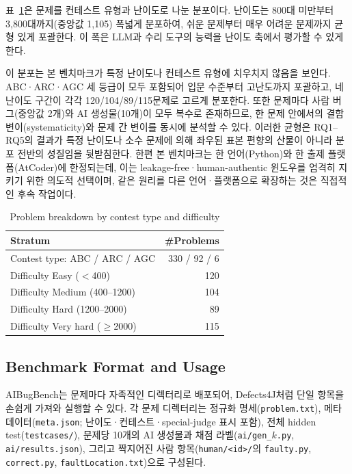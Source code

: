 \documentclass[10pt,conference]{IEEEtran}
\begin{document}
표~\ref{tab:breakdown}은 문제를 컨테스트 유형과 난이도로 나눈 분포이다. 난이도는 800대 미만부터 3{,}800대까지(중앙값 1{,}105) 폭넓게 분포하여, 쉬운 문제부터 매우 어려운 문제까지 균형 있게 포괄한다. 이 폭은 LLM과 수리 도구의 능력을 난이도 축에서 평가할 수 있게 한다.

이 분포는 본 벤치마크가 특정 난이도나 컨테스트 유형에 치우치지 않음을 보인다. ABC·ARC·AGC 세 등급이 모두 포함되어 입문 수준부터 고난도까지 포괄하고, 네 난이도 구간이 각각 120/104/89/115문제로 고르게 분포한다. 또한 문제마다 사람 버그(중앙값 2개)와 AI 생성물(10개)이 모두 복수로 존재하므로, 한 문제 안에서의 결함 변이(systematicity)와 문제 간 변이를 동시에 분석할 수 있다. 이러한 균형은 RQ1{--}RQ5의 결과가 특정 난이도나 소수 문제에 의해 좌우된 표본 편향의 산물이 아니라 분포 전반의 성질임을 뒷받침한다. 한편 본 벤치마크는 한 언어(Python)와 한 출제 플랫폼(AtCoder)에 한정되는데, 이는 leakage-free·human-authentic 윈도우를 엄격히 지키기 위한 의도적 선택이며, 같은 원리를 다른 언어·플랫폼으로 확장하는 것은 직접적인 후속 작업이다.

\begin{table}[t]
\caption{Problem breakdown by contest type and difficulty}
\label{tab:breakdown}
\centering
\begin{tabular}{lr}
\toprule
Stratum & \#Problems \\
\midrule
Contest type: ABC / ARC / AGC & 330 / 92 / 6 \\
Difficulty Easy ($<$400) & 120 \\
Difficulty Medium (400--1200) & 104 \\
Difficulty Hard (1200--2000) & 89 \\
Difficulty Very hard ($\geq$2000) & 115 \\
\bottomrule
\end{tabular}
\end{table}

\subsection{Benchmark Format and Usage}
AIBugBench는 문제마다 자족적인 디렉터리로 배포되어, Defects4J처럼 단일 항목을 손쉽게 가져와 실행할 수 있다. 각 문제 디렉터리는 정규화 명세(\texttt{problem.txt}), 메타데이터(\texttt{meta.json}; 난이도·컨테스트·special-judge 표시 포함), 전체 hidden test(\texttt{testcases/}), 문제당 10개의 AI 생성물과 채점 라벨(\texttt{ai/gen\_$k$.py}, \texttt{ai/results.json}), 그리고 짝지어진 사람 항목(\texttt{human/<id>/}의 \texttt{faulty.py}, \texttt{correct.py}, \texttt{faultLocation.txt})으로 구성된다.
\end{document}
